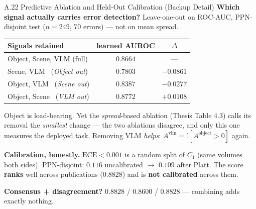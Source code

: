 \documentclass[aspectratio=169,11pt]{beamer}
\begin{document}
\begin{frame}{A.22 Predictive Ablation and Held-Out Calibration (Backup Detail)}
\scriptsize
\textbf{Which signal actually carries error detection?} Leave-one-out on ROC-AUC, PPN-disjoint test ($n=249$, $70$ errors) --- not on mean spread.
\vspace{1mm}
\begin{center}
\footnotesize
\begin{tabular}{@{}l c c@{}}
\toprule
\textbf{Signals retained} & \textbf{learned AUROC} & \textbf{$\Delta$} \\
\midrule
Object, Scene, VLM (full) & $0.8664$ & --- \\
Scene, VLM \ (\emph{Object out}) & $0.7803$ & $-0.0861$ \\
Object, VLM \ (\emph{Scene out}) & $0.8387$ & $-0.0277$ \\
Object, Scene \ (\emph{VLM out}) & $\mathbf{0.8772}$ & $\mathbf{+0.0108}$ \\
\bottomrule
\end{tabular}
\end{center}
Object is load-bearing. Yet the \emph{spread}-based ablation (Thesis Table 4.3) calls its removal the \emph{smallest} change --- the two ablations disagree, and only this one measures the deployed task. Removing VLM \emph{helps}: $A^{\text{vlm}}=\mathbb{I}[A^{\text{object}}>0]$ again.
\vspace{2mm}

\textbf{Calibration, honestly.} $\text{ECE}<0.001$ is a random split of $C_1$ (same volumes both sides). PPN-disjoint: $\mathbf{0.116}$ uncalibrated $\to$ $\mathbf{0.109}$ after Platt. The score \textbf{ranks} well across publications ($0.8828$) and is \textbf{not calibrated} across them.
\vspace{1.5mm}

\textbf{Consensus + disagreement?} $0.8828$ / $0.8600$ / $0.8828$ --- combining adds exactly nothing.
\end{frame}
\end{document}
